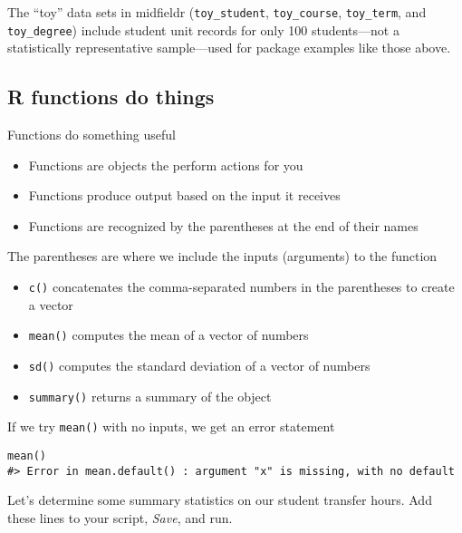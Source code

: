 \documentclass[
]{book}
\providecommand{\tightlist}{%
  \setlength{\itemsep}{0pt}\setlength{\parskip}{0pt}}
\begin{document}
The ``toy'' data sets in midfieldr (\texttt{toy\_student}, \texttt{toy\_course}, \texttt{toy\_term}, and \texttt{toy\_degree}) include student unit records for only 100 students---not a statistically representative sample---used for package examples like those above.

\hypertarget{r-functions-do-things}{%
\subsection{R functions do things}\label{r-functions-do-things}}

Functions do something useful

\begin{itemize}
\tightlist
\item
  Functions are objects the perform actions for you
\item
  Functions produce output based on the input it receives
\item
  Functions are recognized by the parentheses at the end of their names
\end{itemize}

The parentheses are where we include the inputs (arguments) to the function

\begin{itemize}
\tightlist
\item
  \texttt{c()} concatenates the comma-separated numbers in the parentheses to create a vector
\item
  \texttt{mean()} computes the mean of a vector of numbers
\item
  \texttt{sd()} computes the standard deviation of a vector of numbers
\item
  \texttt{summary()} returns a summary of the object
\end{itemize}

If we try \texttt{mean()} with no inputs, we get an error statement

\begin{verbatim}
mean()
#> Error in mean.default() : argument "x" is missing, with no default
\end{verbatim}

Let's determine some summary statistics on our student transfer hours. Add these lines to your script, \emph{Save}, and run.
\end{document}
